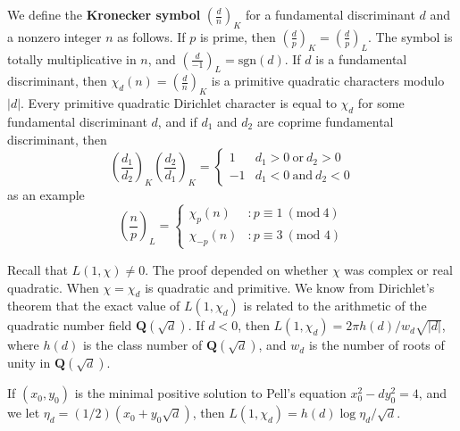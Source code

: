 We define the {\bf Kronecker symbol} $\left( \frac{d}{n} \right)_K$ for a fundamental discriminant $d$ and a nonzero integer $n$ as follows. If $p$ is prime, then $\left( \frac{d}{p} \right)_K = \left( \frac{d}{p} \right)_L$. The symbol is totally multiplicative in $n$, and $\left( \frac{d}{-1} \right)_L = \text{sgn}(d)$. If $d$ is a fundamental discriminant, then $\chi_d(n) = \left( \frac{d}{n} \right)_K$ is a primitive quadratic characters modulo $|d|$. Every primitive quadratic Dirichlet character is equal to $\chi_d$ for some fundamental discriminant $d$, and if $d_1$ and $d_2$ are coprime fundamental discriminant, then
%
\[ \left( \frac{d_1}{d_2} \right)_K \left( \frac{d_2}{d_1} \right)_K = \begin{cases} 1 & d_1 > 0\ \text{or}\ d_2 > 0 \\ -1 & d_1 < 0\ \text{and}\ d_2 < 0 \end{cases} \]
%
as an example
%
\[ \left( \frac{n}{p} \right)_L = \begin{cases} \chi_p(n) &: p \equiv 1\ (\text{mod}\ 4) \\ \chi_{-p}(n) &: p \equiv 3\ (\text{mod 4}) \end{cases} \]

Recall that $L(1,\chi) \neq 0$. The proof depended on whether $\chi$ was complex or real quadratic. When $\chi = \chi_d$ is quadratic and primitive. We know from Dirichlet's theorem that the exact value of $L(1,\chi_d)$ is related to the arithmetic of the quadratic number field $\mathbf{Q}(\sqrt{d})$. If $d < 0$, then $L(1,\chi_d) = 2 \pi h(d)/ w_d \sqrt{|d|}$, where $h(d)$ is the class number of $\mathbf{Q}(\sqrt{d})$, and $w_d$ is the number of roots of unity in $\mathbf{Q}(\sqrt{d})$.

If $(x_0,y_0)$ is the minimal positive solution to Pell's equation $x_0^2 - dy_0^2 = 4$, and we let $\eta_d = (1/2)(x_0 + y_0 \sqrt{d})$, then $L(1,\chi_d) = h(d) \log \eta_d / \sqrt{d}$.

